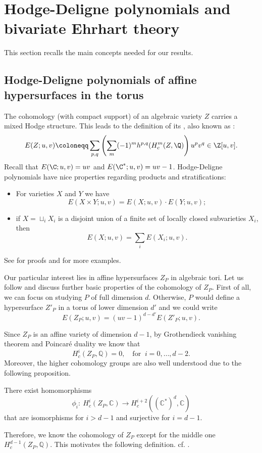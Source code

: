 \documentclass[reqno, 11pt, a4paper, oneside]{amsart}
\begin{document}
\section{Hodge-Deligne polynomials and bivariate Ehrhart theory} \label{sec:hodge}

This section recalls the main concepts needed for our results.

\subsection{Hodge-Deligne polynomials of affine hypersurfaces in the torus}
The cohomology (with compact support) of an algebraic variety $Z$ carries a mixed Hodge structure. This leads to the definition of its , also known as 
:
 \[ E(Z; u, v) \coloneqq \sum_{p,q} \left(\sum_{m} (-1)^m  h^{p,q} (H^m_c(Z, \Q) \right) u^p v^q \in \Z[u,v].\]
Recall that $E(\C; u,v)=uv$ and $E(\C^*; u,v)=uv-1$. Hodge-Deligne polynomials have nice properties regarding products and stratifications:
\begin{itemize}
    \item For varieties $X$ and $Y$ we have 
    \[ E(X \times Y; u,v) = E(X;u,v) \cdot E(Y; u,v); \] 
    \item if $X = \sqcup_i X_i$ is a disjoint union of a finite set of locally closed subvarieties $X_i$, then
    \[ E(X; u,v) = \sum_i E(X_i; u,v). \] 
\end{itemize}
See \cite{danilov_newton_1987} for proofs and \cite{di_rocco_discrete_2016} for more examples.

\smallskip
Our particular interest lies in affine hypersurfaces $Z_P$ in algebraic tori. Let us follow \cite{danilov_newton_1987} and discuss further basic properties of the cohomology of $Z_P$. 
First of all, we can focus on studying $P$ of full dimension $d$. Otherwise, $P$ would define a hypersurface $Z'_P$ in a torus of lower dimension  $d'$ and we could write 
\begin{equation} E(Z_P; u,v) = (uv-1)^{d-d'} E(Z'_P; u,v). \label{low-dim}\end{equation}

Since $Z_P$ is an affine variety of dimension $d-1$, by Grothendieck vanishing theorem and Poincaré duality we know that  
\[ H_c^i(Z_P, \mathbb{Q}) =0, \quad \text{for } ~ i=0,\ldots, d-2. \] 
Moreover, the higher cohomology groups are also well understood due to the following proposition. 
\begin{prop}
There exist   homomorphisms  
\[     \phi_i: ~H_c^i  (Z_P, \mathbb{C})    \rightarrow   H_c^{i+2} (  \left(\mathbb{C}^* \right)^d , \mathbb{C})  \]
that are isomorphisms for $i > d-1$ and surjective for $i=d-1$.    
\end{prop}
Therefore, we know the cohomology of $Z_P$ except for the middle one $H^{d-1}_c(Z_P, \mathbb{Q})$. This motivates the following definition. cf. \cite{batyrev_variations_1993}.
\end{document}
